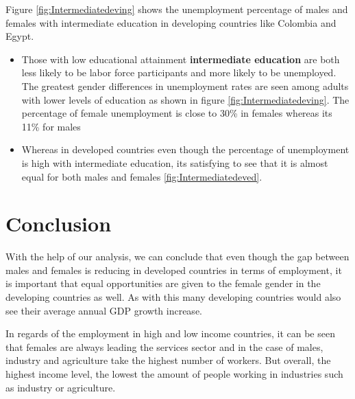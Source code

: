 \documentclass[11pt,a4paper,]{article}
\begin{document}
Figure \ref{fig:Intermediatedeving} shows the unemployment percentage of males and females with intermediate education in developing countries like Colombia and Egypt.

\begin{itemize}
\item
  Those with low educational attainment \textbf{intermediate education} are both less likely to be labor force participants and more likely to be unemployed. The greatest gender differences in unemployment rates are seen among adults with lower levels of education as shown in figure \ref{fig:Intermediatedeving}. The percentage of female unemployment is close to 30\% in females whereas its 11\% for males
\item
  Whereas in developed countries even though the percentage of unemployment is high with intermediate education, its satisfying to see that it is almost equal for both males and females \ref{fig:Intermediatedeved}. \autocite{education}
\end{itemize}

\clearpage

\hypertarget{conclusion}{%
\section{Conclusion}\label{conclusion}}

With the help of our analysis, we can conclude that even though the gap between males and females is reducing in developed countries in terms of employment, it is important that equal opportunities are given to the female gender in the developing countries as well. As with this many developing countries would also see their average annual GDP growth increase.

In regards of the employment in high and low income countries, it can be seen that females are always leading the services sector and in the case of males, industry and agriculture take the highest number of workers. But overall, the highest income level, the lowest the amount of people working in industries such as industry or agriculture.

\printbibliography
\end{document}
